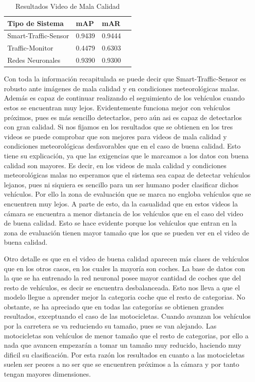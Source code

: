 \begin{table}[htbp]
\begin{center}
\begin{tabular}{|l|l|l|l|}
\hline
Tipo de Sistema & mAP & mAR  \\ 
\hline \hline
Smart-Traffic-Sensor & 0.9439 & 0.9444 \\ \hline
Traffic-Monitor & 0.4479 & 0.6303 \\ \hline
Redes Neuronales & 0.9390 & 0.9300\\ \hline
\end{tabular}
\caption{Resultados Video de Mala Calidad}
\label{resultados_video_mala_calidad}
\end{center}
\end{table}

Con toda la información recapitulada se puede decir que Smart-Traffic-Sensor es robusto ante imágenes de mala calidad y en condiciones meteorológicas malas. Además es capaz de continuar realizando el seguimiento de los vehículos cuando estos se encuentran muy lejos.
Evidentemente funciona mejor con vehículos próximos, pues es más sencillo detectarlos, pero aún asi es  capaz de detectarlos con gran calidad. Si nos fijamos en los resultados que se obtienen en los tres videos se puede comprobar que son mejores para videos de mala calidad y condiciones meteorológicas desfavorables que en el caso de buena calidad. Esto tiene su explicación, ya que las exigencias que le marcamos a los datos con buena calidad son mayores. Es decir, en los videos de mala calidad y condiciones meteorológicas malas  no esperamos que el sistema sea capaz de detectar vehículos lejanos, pues ni siquiera es sencillo para un ser humano poder clasificar dichos vehículos. Por ello la zona de evaluación que se marca no engloba vehículos que se encuentren muy lejos. A parte de esto, da la casualidad que en estos videos la cámara se encuentra a menor distancia de los vehículos que en el caso del video de buena calidad. Esto se hace evidente porque los vehículos que entran en la zona de evaluación tienen mayor tamaño que los que se pueden ver en el video de buena calidad.

Otro detalle es que en el video de buena calidad aparecen más clases de vehículos que en los otros casos, en los cuales la mayoría son coches. La base de datos con la que se ha entrenado la red neuronal posee mayor cantidad de coches que del resto de vehículos, es decir se encuentra desbalanceada. Esto nos lleva a que el modelo llegue a aprender mejor la categoria coche que el resto de categorias. No obstante, se ha apreciado que en todas las categorías se obtienen grandes resultados, exceptuando el caso de las motocicletas. Cuando avanzan los vehículos por la carretera se va reduciendo su tamaño, pues se van alejando. Las motocicletas son vehículos de menor tamaño que el resto de categorias, por ello a nada que avancen empezarán a tomar un tamaño muy reducido, haciendo muy dificil su clasificación. Por esta razón los resultados en cuanto a las motocicletas suelen ser peores a no ser que se encuentren próximos a la cámara y por tanto tengan mayores dimensiones.

